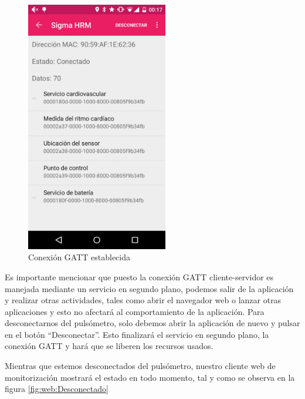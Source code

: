 \begin{figure}[H]
\begin{minipage}{0.45\textwidth}
    \includegraphics[height=11cm]{graphs/AndroidConectado.png} \caption{Conexión GATT establecida}\label{fig:screen:Conectado}
\end{minipage}
\end{figure}

Es importante mencionar que puesto la conexión GATT cliente-servidor es manejada mediante un servicio en segundo plano, podemos salir de la aplicación y realizar otras actividades, tales como abrir el navegador web o lanzar otras aplicaciones y esto no afectará al comportamiento de la aplicación.
Para desconectarnos del pulsómetro, solo debemos abrir la aplicación de nuevo y pulsar en el botón ``Desconectar''. Esto finalizará el servicio en segundo plano, la conexión GATT y hará que se liberen los recursos usados.

Mientras que estemos desconectados del pulsómetro, nuestro cliente web de monitorización mostrará el estado  en todo momento, tal y como se observa en la figura \ref{fig:web:Desconectado}
    
